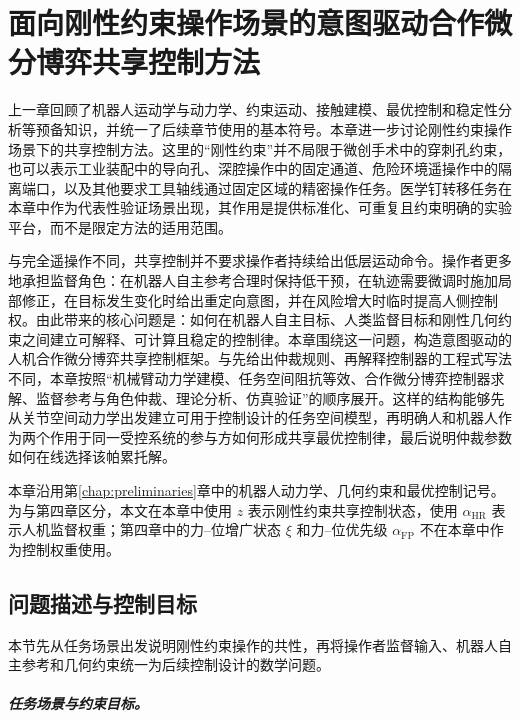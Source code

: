 \chapter{面向刚性约束操作场景的意图驱动合作微分博弈共享控制方法}
\label{chap:intent_gt_rigid}

上一章回顾了机器人运动学与动力学、约束运动、接触建模、最优控制和稳定性分析等预备知识，并统一了后续章节使用的基本符号。本章进一步讨论刚性约束操作场景下的共享控制方法。这里的“刚性约束”并不局限于微创手术中的穿刺孔约束，也可以表示工业装配中的导向孔、深腔操作中的固定通道、危险环境遥操作中的隔离端口，以及其他要求工具轴线通过固定区域的精密操作任务。医学钉转移任务在本章中作为代表性验证场景出现，其作用是提供标准化、可重复且约束明确的实验平台，而不是限定方法的适用范围。

与完全遥操作不同，共享控制并不要求操作者持续给出低层运动命令。操作者更多地承担监督角色：在机器人自主参考合理时保持低干预，在轨迹需要微调时施加局部修正，在目标发生变化时给出重定向意图，并在风险增大时临时提高人侧控制权。由此带来的核心问题是：如何在机器人自主目标、人类监督目标和刚性几何约束之间建立可解释、可计算且稳定的控制律。本章围绕这一问题，构造意图驱动的人机合作微分博弈共享控制框架。与先给出仲裁规则、再解释控制器的工程式写法不同，本章按照“机械臂动力学建模、任务空间阻抗等效、合作微分博弈控制器求解、监督参考与角色仲裁、理论分析、仿真验证”的顺序展开。这样的结构能够先从关节空间动力学出发建立可用于控制设计的任务空间模型，再明确人和机器人作为两个作用于同一受控系统的参与方如何形成共享最优控制律，最后说明仲裁参数如何在线选择该帕累托解。

本章沿用第\ref{chap:preliminaries}章中的机器人动力学、几何约束和最优控制记号。为与第四章区分，本文在本章中使用 $z$ 表示刚性约束共享控制状态，使用 $\alpha_{\mathrm{HR}}$ 表示人机监督权重；第四章中的力--位增广状态 $\xi$ 和力--位优先级 $\alpha_{\mathrm{FP}}$ 不在本章中作为控制权重使用。

\section{问题描述与控制目标}
\label{sec:ch3_problem}

本节先从任务场景出发说明刚性约束操作的共性，再将操作者监督输入、机器人自主参考和几何约束统一为后续控制设计的数学问题。

\paragraph{任务场景与约束目标。}
\label{subsec:ch3_task}

